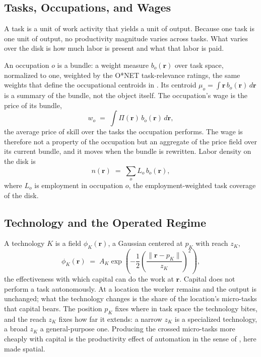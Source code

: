 \documentclass[12pt, a4paper]{article}
\begin{document}
\subsection{Tasks, Occupations, and Wages}
\label{sec:tasks-occ}

A task is a unit of work activity that yields a unit of output. Because
one task is one unit of output, no productivity magnitude varies across
tasks. What varies over the disk is how much labor is present and what
that labor is paid.

An occupation $o$ is a bundle: a weight measure $b_o(\mathbf{r})$ over
task space, normalized to one, weighted by the O*NET task-relevance
ratings, the same weights that define the occupational centroids in
\textcite{storck2026geometry}. Its centroid
$\mu_o = \int \mathbf{r}\, b_o(\mathbf{r})\, d\mathbf{r}$ is a summary
of the bundle, not the object itself. The occupation's wage is the
price of its bundle,
\begin{equation}
  w_o \;=\; \int \Pi(\mathbf{r})\, b_o(\mathbf{r})\, d\mathbf{r},
  \label{eq:wage-bundle}
\end{equation}
the average price of skill over the tasks the occupation performs. The
wage is therefore not a property of the occupation but an aggregate of
the price field over its current bundle, and it moves when the bundle
is rewritten. Labor density on the disk is
\begin{equation}
  n(\mathbf{r}) \;=\; \sum_o L_o\, b_o(\mathbf{r}),
  \label{eq:labor-density}
\end{equation}
where $L_o$ is employment in occupation $o$, the employment-weighted
task coverage of the disk.

\subsection{Technology and the Operated Regime}
\label{sec:regime}

A technology $K$ is a field $\phi_K(\mathbf{r})$, a
Gaussian centered at $p_K$ with reach $z_K$,
\begin{equation}
  \phi_K(\mathbf{r})
  \;=\;
  A_K \exp\!\left(-\frac{1}{2}
  \left(\frac{\|\mathbf{r} - p_K\|}{z_K}\right)^2\right),
  \label{eq:phi-K}
\end{equation}
the effectiveness with which capital can do the work at $\mathbf{r}$.
Capital does not perform a task autonomously. At a location the worker
remains and the output is unchanged; what the technology changes is the
share of the location's micro-tasks that capital bears. The position
$p_K$ fixes where in task space the technology bites, and the reach
$z_K$ fixes how far it extends: a narrow $z_K$ is a specialized
technology, a broad $z_K$ a general-purpose one. Producing the crossed
micro-tasks more cheaply with capital is the productivity effect of
automation in the sense of \textcite{acemoglu2018race}, here made
spatial.
\end{document}

